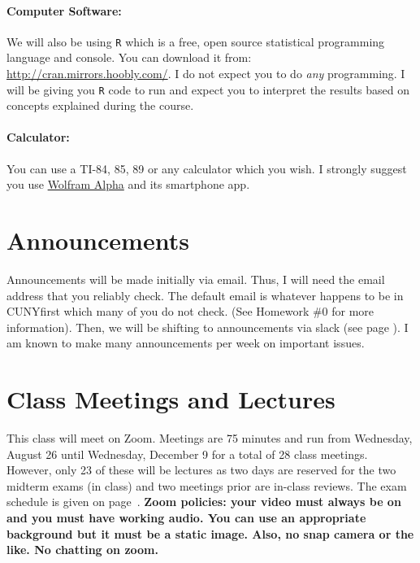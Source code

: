 \documentclass[12pt]{article}
\begin{document}
\paragraph{Computer Software:} We will also be using \texttt{R} which is a free, open source statistical programming language and console. You can download it from: \url{http://cran.mirrors.hoobly.com/}. I do not expect you to do \textit{any} programming. I will be giving you \texttt{R} code to run and expect you to interpret the results based on concepts explained during the course.

\paragraph{Calculator:} You can use a TI-84, 85, 89 or any calculator which you wish. I strongly suggest you use \href{http://www.wolframalpha.com/}{Wolfram Alpha} and its smartphone app.

\section*{Announcements}

Announcements will be made initially via email. Thus, I will need the email address that you reliably check. The default email is whatever happens to be in CUNYfirst which many of you do not check. (See Homework \#0 for more information). Then, we will be shifting to announcements via slack (see page \pageref{sec:slack}). I am known to make many announcements per week on important issues. 

\section*{Class Meetings and Lectures}

This class will meet on Zoom. Meetings are 75 minutes and run from Wednesday, August 26 until Wednesday, December 9 for a total of 28 class meetings. However, only 23 of these will be lectures as two days are reserved for the two midterm exams (in class) and two meetings prior are in-class reviews. The exam schedule is given on page~\pageref{subsec:exam_schedule}. \textbf{Zoom policies: your video must always be on and you must have working audio. You can use an appropriate background but it must be a static image. Also, no snap camera or the like. No chatting on zoom.}
\end{document}
